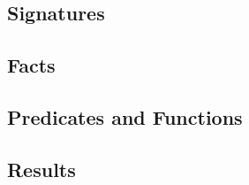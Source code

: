 \subsection{Signatures}
\label{sect:alloy:signatures}


\subsection{Facts}
\label{sect:alloy:facts}


\subsection{Predicates and Functions}
\label{sect:alloy:predicates}


\subsection{Results}
\label{sect:alloy:results}
